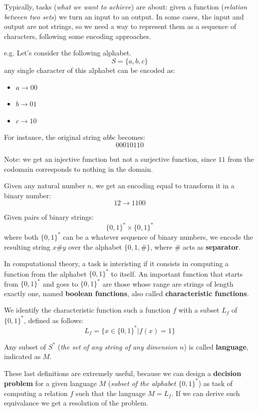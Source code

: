 Typically, tasks (\textit{what we want to achieve}) are about: given a function (\textit{relation between two sets}) we turn an input to an output. In some cases,
the input and output are not strings, so we need a way to represent them as a sequence of characters, following some encoding approaches.
\begin{example}
    e.g. Let's consider the following alphabet.
    $$S = \{a, b, c\}$$
    any single character of this alphabet can be encoded as:
    \begin{itemize}
        \renewcommand{\labelitemi}{}
        \item $a \rightarrow 00$
        \item $b \rightarrow 01$
        \item $c \rightarrow 10$
    \end{itemize}

    For instance, the original string $abbc$ becomes:
    $$00010110$$

    Note: we get an injective function but not a surjective function, since $11$ from the codomain corresponds to nothing in the domain.
\end{example}
\begin{definition}
    Given any natural number $n$, we get an encoding equal to transform it in a binary number:
    $$12 \rightarrow 1100$$
\end{definition}
\begin{definition}
    Given pairs of binary strings:
    $$\{0,1\}^* \times \{0,1\}^*$$
    where both $\{0,1\}^*$ can be a whatever sequence of binary numbers, we encode the resulting string $x \# y$ over the alphabet $\{0,1,\#\}$, where $\#$ acts as 
    \textbf{separator}.
\end{definition}
In computational theory, a task is interisting if it consists in computing a function from the alphabet $\{0,1\}^*$ to itself. An important function that starts
from $\{0,1\}^*$ and goes to $\{0,1\}^*$ are those whose range are strings of length exactly one, named \textbf{boolean functions}, also called \textbf{characteristic functions}.
\begin{definition}
    We identify the characteristic function such a function $f$ with a subset $L_f$ of $\{0,1\}^*$, defined as follows:
    $$L_f = \{x \in \{0,1\}^*|f(x) = 1\}$$
\end{definition}
\begin{definition}
    Any subset of $S^*$ (\textit{the set of any string of any dimension $n$}) is called \textbf{language}, indicated as $M$.
\end{definition}
These last definitions are extremely useful, because we can design a \textbf{decision problem} for a given language $M$ (\textit{subset of the alphabet $\{0,1\}^*$})
as task of computing a relation $f$ such that the language $M = L_f$. If we can derive such equivalance we get a resolution of the problem.  